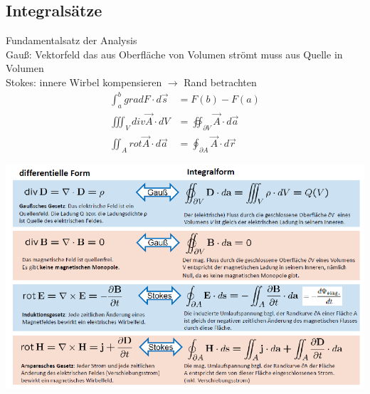 \subsection{Integralsätze}
Fundamentalsatz der Analysis\\
Gauß: Vektorfeld das aus Oberfläche von Volumen strömt muss aus Quelle in Volumen\\
Stokes: innere Wirbel kompensieren $\rightarrow$ Rand betrachten
\begin{align*}
    \int_{a}^b grad F \cdot d \vec{s}     & = F(b) - F(a)                                  \\
    \iiint_V div \vec{A} \cdot dV         & = \oiint_{ \partial V} \vec{A} \cdot d \vec{a} \\
    \iint_{A} rot \vec{A} \cdot d \vec{a} & = \oint_{ \partial A} \vec{A} \cdot d \vec{r}
\end{align*}

\includegraphics[width=\columnwidth]{Figures/Integralsatz.png}


